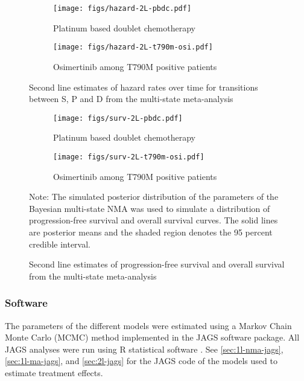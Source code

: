 \documentclass[11pt,final,fleqn]{article}\usepackage[]{graphicx}\usepackage[]{color}
\theoremstyle{plain}
\newcommand\R{{\textsf{R}}}
\begin{document}
{\begin{figure}
\centering
\begin{subfigure}{\textwidth}
\centering
\texttt{[image: figs/hazard-2L-pbdc.pdf]}
\caption{Platinum based doublet chemotherapy} \label{subfig:hazard-2L-pbdc}
\end{subfigure}
\begin{subfigure}{\textwidth}
\centering
\texttt{[image: figs/hazard-2L-t790m-osi.pdf]}
\caption{Osimertinib among T790M positive patients} \label{subfig:hazard-2L-t790m-osi}
\end{subfigure}
\caption{Second line estimates of hazard rates over time for transitions between S, P and D from the multi-state meta-analysis}\label{fig:hazards-2L}
\end{figure}




\begin{figure}
\centering
\begin{subfigure}{\textwidth}
\centering
\texttt{[image: figs/surv-2L-pbdc.pdf]}
\caption{Platinum based doublet chemotherapy} \label{subfig:surv-2L-pbdc}
\end{subfigure}
\begin{subfigure}{\textwidth}
\centering
\texttt{[image: figs/surv-2L-t790m-osi.pdf]}
\caption{Osimertinib among T790M positive patients} \label{subfig:surv-2L_t790m-osi}
\end{subfigure}
\caption{Second line estimates of progression-free survival and overall survival from the multi-state meta-analysis}\label{fig:surv-2L}
\begin{minipage}{\linewidth}
\footnotesize
Note: The simulated posterior distribution of the parameters of the Bayesian multi-state NMA was used to simulate a distribution of progression-free survival and overall survival curves. The solid lines are posterior means and the shaded region denotes the 95 percent credible interval.
\end{minipage}
\end{figure}

\FloatBarrier


\subsubsection{Software}
The parameters of the different models were estimated using a Markov Chain Monte Carlo (MCMC) method implemented in the JAGS software package. All JAGS analyses were run using \R{} statistical software \citep{team2014r}. See \autoref{sec:1l-nma-jags}, \autoref{sec:1l-ma-jags}, and \autoref{sec:2l-jags} for the JAGS code of the models used to estimate treatment effects.

}
\end{document}
